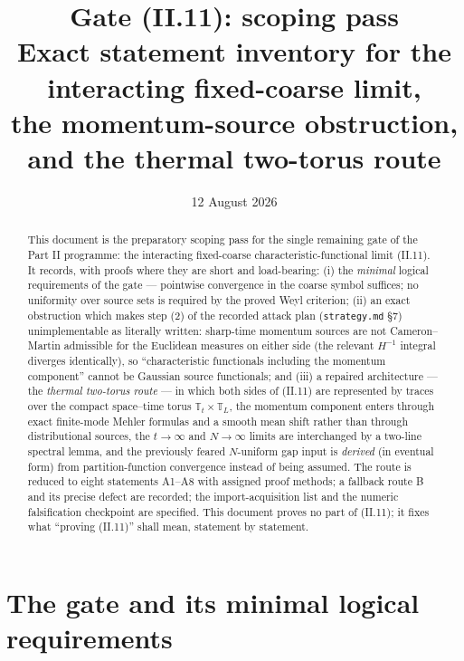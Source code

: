 \documentclass[11pt,a4paper]{article}
\title{Gate (II.11): scoping pass\\[4pt]
\large Exact statement inventory for the interacting fixed-coarse limit,\\
the momentum-source obstruction, and the thermal two-torus route}
\author{}
\date{12 August 2026}
\theoremstyle{plain}
\theoremstyle{definition}
\newcommand{\T}{\mathbb{T}}
\begin{document}
\maketitle

\begin{abstract}
This document is the preparatory scoping pass for the single remaining gate of the
Part II programme: the interacting fixed-coarse characteristic-functional limit
(II.11). It records, with proofs where they are short and load-bearing:
(i) the \emph{minimal} logical requirements of the gate --- pointwise convergence in the
coarse symbol suffices; no uniformity over source sets is required by the proved Weyl
criterion; (ii) an exact obstruction which makes step (2) of the recorded attack plan
(\texttt{strategy.md} \S7) unimplementable as literally written: sharp-time momentum
sources are not Cameron--Martin admissible for the Euclidean measures on either side
(the relevant $H^{-1}$ integral diverges identically), so ``characteristic functionals
including the momentum component'' cannot be Gaussian source functionals; and (iii) a
repaired architecture --- the \emph{thermal two-torus route} --- in which both sides of
(II.11) are represented by traces over the compact space--time torus
$\T_t\times\T_L$, the momentum component enters through exact finite-mode Mehler
formulas and a smooth mean shift rather than through distributional sources, the
$t\to\infty$ and $N\to\infty$ limits are interchanged by a two-line spectral lemma, and
the previously feared $N$-uniform gap input is \emph{derived} (in eventual form) from
partition-function convergence instead of being assumed. The route is reduced to eight
statements A1--A8 with assigned proof methods; a fallback route B and its precise
defect are recorded; the import-acquisition list and the numeric falsification
checkpoint are specified. This document proves no part of (II.11); it fixes what
``proving (II.11)'' shall mean, statement by statement.
\end{abstract}

\tableofcontents

\section{The gate and its minimal logical requirements}\label{sec:gate}
\end{document}
